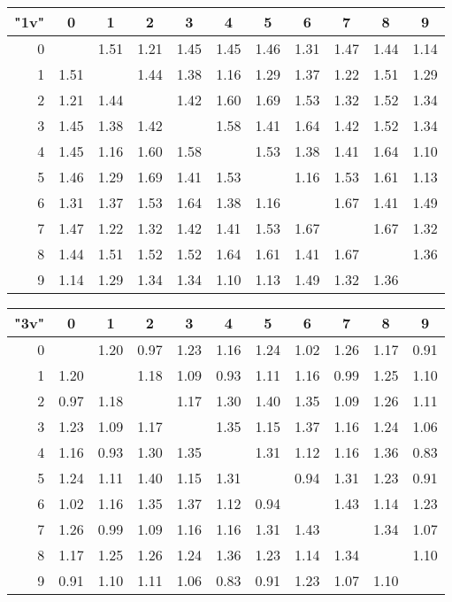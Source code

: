 \begin{table*}
	\centering
	\begin{tabular}{|r||c|c|c|c|c|c|c|c|c|c|}\hline
		{\bf "1v"} & 0 & 1 & 2 & 3 & 4 & 5 & 6 & 7 & 8 & 9 \\\hline\hline
0 & &1.51 &1.21 &1.45 &1.45 &1.46 &1.31 &1.47 &1.44 &1.14  \\\hline
1 &1.51 & &1.44 &1.38 &1.16 &1.29 &1.37 &1.22 &1.51 &1.29  \\\hline
2 &1.21 &1.44 & &1.42 &1.60 &1.69 &1.53 &1.32 &1.52 &1.34  \\\hline
3 &1.45 &1.38 &1.42 & &1.58 &1.41 &1.64 &1.42 &1.52 &1.34  \\\hline
4 &1.45 &1.16 &1.60 &1.58 & &1.53 &1.38 &1.41 &1.64 &1.10  \\\hline
5 &1.46 &1.29 &1.69 &1.41 &1.53 & &1.16 &1.53 &1.61 &1.13  \\\hline
6 &1.31 &1.37 &1.53 &1.64 &1.38 &1.16 & &1.67 &1.41 &1.49  \\\hline
7 &1.47 &1.22 &1.32 &1.42 &1.41 &1.53 &1.67 & &1.67 &1.32  \\\hline
8 &1.44 &1.51 &1.52 &1.52 &1.64 &1.61 &1.41 &1.67 & &1.36  \\\hline
9 &1.14 &1.29 &1.34 &1.34 &1.10 &1.13 &1.49 &1.32 &1.36 &  \\\hline
	\end{tabular}

	\vspace{0.3cm}
	
	\begin{tabular}{|r||c|c|c|c|c|c|c|c|c|c|}\hline
		{\bf "3v"} & 0 & 1 & 2 & 3 & 4 & 5 & 6 & 7 & 8 & 9 \\\hline\hline
0 & &1.20 &0.97 &1.23 &1.16 &1.24 &1.02 &1.26 &1.17 &0.91  \\\hline
1 &1.20 & &1.18 &1.09 &0.93 &1.11 &1.16 &0.99 &1.25 &1.10  \\\hline
2 &0.97 &1.18 & &1.17 &1.30 &1.40 &1.35 &1.09 &1.26 &1.11  \\\hline
3 &1.23 &1.09 &1.17 & &1.35 &1.15 &1.37 &1.16 &1.24 &1.06  \\\hline
4 &1.16 &0.93 &1.30 &1.35 & &1.31 &1.12 &1.16 &1.36 &0.83  \\\hline
5 &1.24 &1.11 &1.40 &1.15 &1.31 & &0.94 &1.31 &1.23 &0.91  \\\hline
6 &1.02 &1.16 &1.35 &1.37 &1.12 &0.94 & &1.43 &1.14 &1.23  \\\hline
7 &1.26 &0.99 &1.09 &1.16 &1.16 &1.31 &1.43 & &1.34 &1.07  \\\hline
8 &1.17 &1.25 &1.26 &1.24 &1.36 &1.23 &1.14 &1.34 & &1.10  \\\hline
9 &0.91 &1.10 &1.11 &1.06 &0.83 &0.91 &1.23 &1.07 &1.10 &  \\\hline
	\end{tabular}
	

\end{table*}
